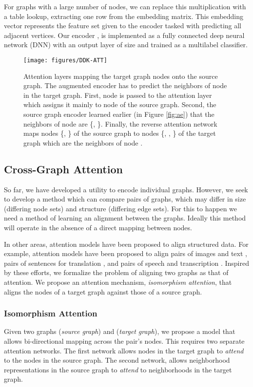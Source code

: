 \documentclass[sigconf]{acmart}
\begin{document}
For graphs with a large number of nodes, we can replace this multiplication with a table lookup, extracting one row from the embedding matrix.
This embedding vector represents the feature set given to the encoder tasked with predicting all adjacent vertices.
Our encoder , is implemented as a fully connected deep neural network (DNN) with an output layer of size  and trained as a multilabel classifier.


\begin{figure}[t]
\texttt{[image: figures/DDK-ATT]}
\caption{Attention layers mapping the target graph nodes onto the source graph.
The augmented encoder has to predict the neighbors of node  in the target graph.
First, node  is passed to the attention layer which assigns it mainly to node  of the source graph.
Second, the source graph encoder learned earlier (in Figure \ref{fig:ae}) that the neighbors of node  are \{, \}.
Finally, the reverse attention network maps nodes \{, \} of the source graph to nodes \{, , \} of the target graph which are the neighbors of node .
}
\label{fig:attention}
\end{figure}



\subsection{Cross-Graph Attention}
\label{sec:attention}
So far, we have developed a utility to encode individual graphs. 
However, we seek to develop a method which can compare pairs of graphs, which may  differ in size (differing node sets) and structure (differing edge sets). 
For this to happen we need a method of learning an alignment between the graphs. Ideally this method will operate in the absence of a direct mapping between nodes.



In other areas, attention models have been proposed to align structured data.
For example, attention models have been proposed to align pairs of images and text \cite{xu2015show}, pairs of sentences for translation \cite{vaswani2017attention}, and pairs of speech and transcription \cite{NIPS2015_5847}.
Inspired by these efforts, we formalize the problem of aligning two graphs as that of attention.
We propose an attention mechanism, \emph{isomorphism attention}, that aligns the nodes of a target graph against those of a source graph.


\subsubsection{Isomorphism Attention}
Given two graphs  (\emph{source graph}) and  (\emph{target graph}), we propose a model that allows bi-directional mapping across the pair's nodes.
This requires two separate attention networks.
The first network allows nodes in the target graph to \emph{attend} to the nodes in the source graph.
The second network, allows neighborhood representations in the source graph to \emph{attend} to neighborhoods in the target graph.
\end{document}

